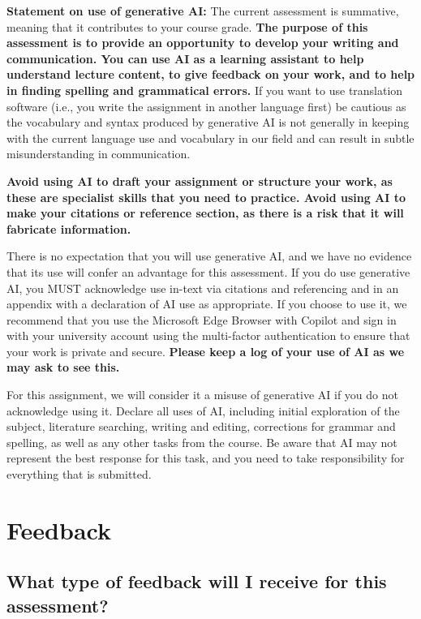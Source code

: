 \documentclass[
  english,
  letterpaper,
  DIV=11,
  numbers=noendperiod]{scrreprt}
\begin{document}
\textbf{Statement on use of generative AI:} The current assessment is
summative, meaning that it contributes to your course grade. \textbf{The
purpose of this assessment is to provide an opportunity to develop your
writing and communication. You can use AI as a learning assistant to
help understand lecture content, to give feedback on your work, and to
help in finding spelling and grammatical errors.} If you want to use
translation software (i.e., you write the assignment in another language
first) be cautious as the vocabulary and syntax produced by generative
AI is not generally in keeping with the current language use and
vocabulary in our field and can result in subtle misunderstanding in
communication.

\textbf{Avoid using AI to draft your assignment or structure your work,
as these are specialist skills that you need to practice. Avoid using AI
to make your citations or reference section, as there is a risk that it
will fabricate information.}

There is no expectation that you will use generative AI, and we have no
evidence that its use will confer an advantage for this assessment. If
you do use generative AI, you MUST acknowledge use in-text via citations
and referencing and in an appendix with a declaration of AI use as
appropriate. If you choose to use it, we recommend that you use the
Microsoft Edge Browser with Copilot and sign in with your university
account using the multi-factor authentication to ensure that your work
is private and secure. \textbf{Please keep a log of your use of AI as we
may ask to see this.}

For this assignment, we will consider it a misuse of generative AI if
you do not acknowledge using it. Declare all uses of AI, including
initial exploration of the subject, literature searching, writing and
editing, corrections for grammar and spelling, as well as any other
tasks from the course. Be aware that AI may not represent the best
response for this task, and you need to take responsibility for
everything that is submitted.

\section{Feedback}\label{portfolio_feedback}

\subsection{What type of feedback will I receive for this
assessment?}\label{what-type-of-feedback-will-i-receive-for-this-assessment-1}
\end{document}
